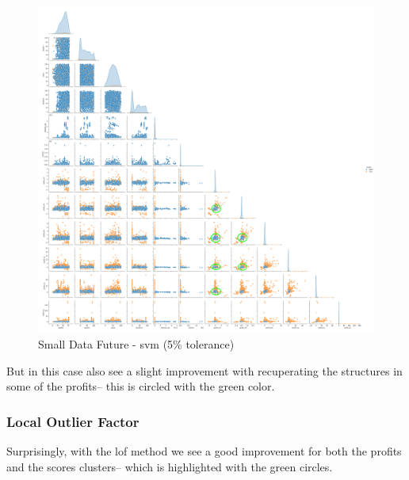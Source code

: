 \documentclass[11pt,english,a4paper,hidelinks]{book}
\begin{document}
\begin{figure}[H]
    \centering
    \includegraphics[width=1\textwidth]{images/code/outliers/Small Data future - SVM.png}
    \caption{Small Data Future - \acrshort{svm} (5\% tolerance)}
    \label{fig:small_data_future_svm}
\end{figure}

\noindent But in this case also see a slight improvement with recuperating the structures in some of the profits--  this is circled with the green color.

\newpage
\subsubsection{Local Outlier Factor}

\noindent Surprisingly, with the \acrshort{lof} method we see a good improvement for both the profits and the scores clusters-- which is highlighted with the green circles.
\end{document}
